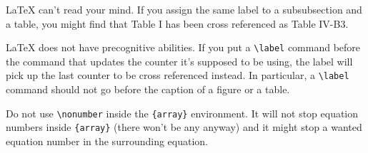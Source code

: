 {\LaTeX} can't read your mind. If you assign the same label to a
subsubsection and a table, you might find that Table I has been cross
referenced as Table IV-B3. 

{\LaTeX} does not have precognitive abilities. If you put a
\verb|\label| command before the command that updates the counter it's
supposed to be using, the label will pick up the last counter to be
cross referenced instead. In particular, a \verb|\label| command
should not go before the caption of a figure or a table.

Do not use \verb|\nonumber| inside the \verb|{array}| environment. It
will not stop equation numbers inside \verb|{array}| (there won't be
any anyway) and it might stop a wanted equation number in the
surrounding equation.